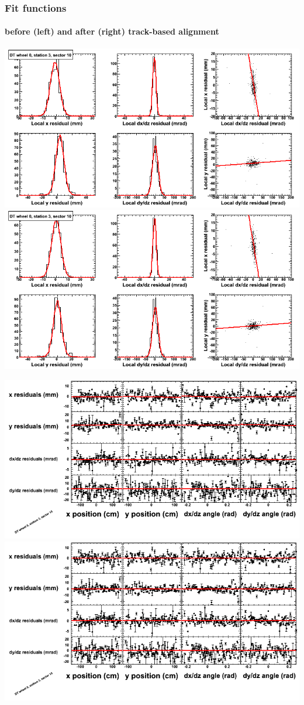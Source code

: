\documentclass[compress]{beamer}
\begin{document}
\begin{frame}
\frametitle{Fit functions}
\framesubtitle{before (left) and after (right) track-based alignment}
\includegraphics[width=0.5\linewidth]{fitfunctions_re01/MBwhCst3sec10_bellcurves.png} \includegraphics[width=0.5\linewidth]{fitfunctions_re05/MBwhCst3sec10_bellcurves.png}

\includegraphics[width=0.5\linewidth]{fitfunctions_re01/MBwhCst3sec10_polynomials.png} \includegraphics[width=0.5\linewidth]{fitfunctions_re05/MBwhCst3sec10_polynomials.png}
\end{frame}
\end{document}
